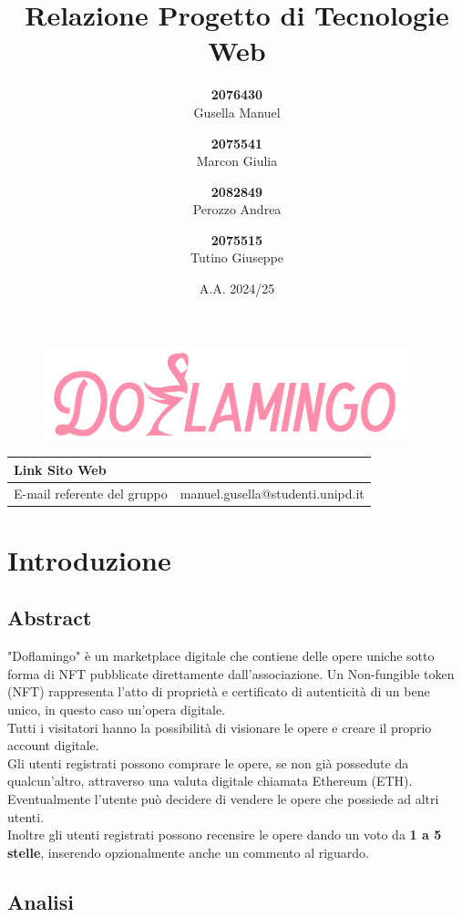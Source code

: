 \documentclass[10pt]{article}
\title{Relazione Progetto di Tecnologie Web}
\author{
    \textbf{2076430}\\ Gusella Manuel \and
    \textbf{2075541}\\ Marcon Giulia \and
    \textbf{2082849}\\ Perozzo Andrea \and
    \textbf{2075515}\\ Tutino Giuseppe
}
\date{A.A. 2024/25}
\begin{document}
\begin{figure}
    \centering
    \includegraphics[width=0.5\linewidth]{logo.png}
\end{figure}
\maketitle
\renewcommand{\arraystretch}{2}
\begin{tabular}{|>{\centering\arraybackslash}m{7cm}|>{\centering\arraybackslash}m{8cm}|}
    \hline
     Link Sito Web & \url{} \\
     \hline
     E-mail referente del gruppo & manuel.gusella@studenti.unipd.it \\
    \hline
\end{tabular}
\newpage
\tableofcontents
\newpage

\section{Introduzione}
\subsection{Abstract}
"Doflamingo" è un marketplace digitale che contiene delle opere uniche sotto forma di NFT pubblicate direttamente dall'associazione.
Un Non-fungible token (NFT) rappresenta l'atto di proprietà e certificato di autenticità di un bene unico, in questo caso un'opera digitale. \\
Tutti i visitatori hanno la possibilità di visionare le opere e creare il proprio account digitale.\\
Gli utenti registrati possono comprare le opere, se non già possedute da qualcun'altro, attraverso una valuta digitale chiamata Ethereum (ETH). Eventualmente l'utente può decidere di vendere le opere che possiede ad altri utenti.\\ 
Inoltre gli utenti registrati possono recensire le opere dando un voto da \textbf{1 a 5 stelle}, inserendo opzionalmente anche un commento al riguardo.\\


\subsection{Analisi}
\end{document}

